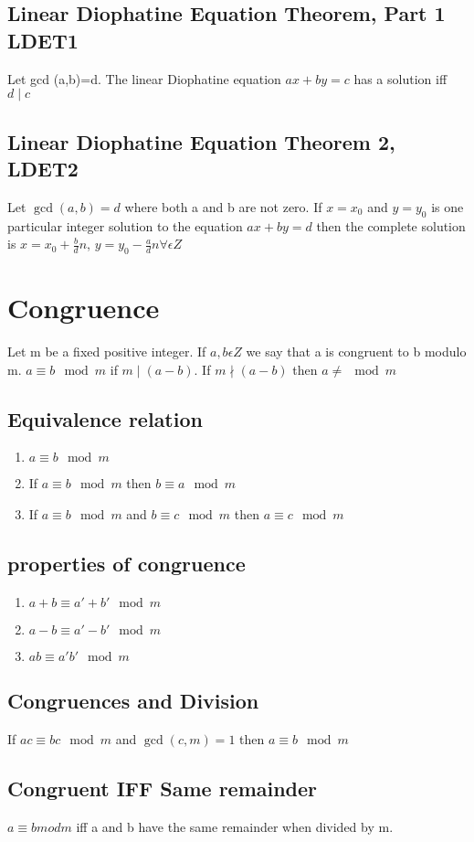 \documentclass[12pt]{article}
\begin{document}
\subsection{Linear Diophatine Equation Theorem, Part 1 LDET1}
Let gcd (a,b)=d. The linear Diophatine equation $ax+by=c$ has a solution iff
$d\mid c$
\subsection{Linear Diophatine Equation Theorem 2, LDET2}
Let $\gcd(a,b)=d$ where both a and b are not zero. If $x=x_0$ and $y=y_0$ is one
particular integer solution to the equation $ax+by=d$ then the complete
solution is $x=x_0+\frac{b}{d} n$, $y=y_0-\frac{a}{d} n \forall \epsilon Z$
\section{Congruence}
Let m be a fixed positive integer. If $a,b \epsilon Z$ we say that a is
congruent to b modulo m. $a\equiv b \mod{m}$ if $m\mid (a-b)$. If $m \nmid (a-b)$
then $a\neq \mod{m}$
\subsection{Equivalence relation}
\begin{enumerate}
  \item{$a\equiv b \mod{m}$}
  \item{If $a\equiv b \mod{m} $ then $b\equiv a \mod{m}$}
  \item{If $a\equiv b \mod{m}$ and $b\equiv c \mod{m}$ then $a\equiv c \mod{m}$}
\end{enumerate}
\subsection{properties of congruence}
\begin{enumerate}
  \item{$a+b\equiv a'+b' \mod{m}$}
  \item{$a-b\equiv a'-b'\mod{m}$}
  \item{$ab\equiv a'b'\mod{m}$}
\end{enumerate}
\subsection{Congruences and Division}
If $ac\equiv bc \mod{m}$ and $\gcd(c,m)=1$ then $a\equiv b \mod{m}$
\subsection{Congruent IFF Same remainder}
$a\equiv b mod m$ iff a and b have the same remainder when divided by m.
\end{document}
